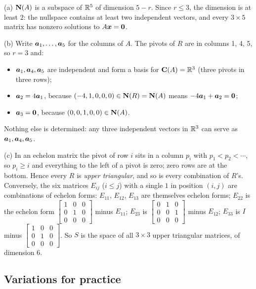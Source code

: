 \begin{solution}
(a) $\mathbf{N}(A)$ is a subspace of $\mathbb{R}^5$ of dimension $5-r$. Since $r\le 3$, the dimension is
at least $2$: the nullspace contains at least two independent vectors, and every
$3\times 5$ matrix has nonzero solutions to $A\boldsymbol{x}=\boldsymbol{0}$.

(b) Write $\boldsymbol{a}_1,\dots,\boldsymbol{a}_5$ for the columns of $A$. The pivots of $R$ are in columns
1, 4, 5, so $r=3$ and:
\begin{itemize}
  \item $\boldsymbol{a}_1,\boldsymbol{a}_4,\boldsymbol{a}_5$ are independent and form a basis for
    $\mathbf{C}(A)=\mathbb{R}^3$ (three pivots in three rows);
  \item $\boldsymbol{a}_2=4\boldsymbol{a}_1$, because $(-4,1,0,0,0)\in\mathbf{N}(R)=\mathbf{N}(A)$ means
    $-4\boldsymbol{a}_1+\boldsymbol{a}_2=\boldsymbol{0}$;
  \item $\boldsymbol{a}_3=\boldsymbol{0}$, because $(0,0,1,0,0)\in\mathbf{N}(A)$.
\end{itemize}
Nothing else is determined: any three independent vectors in $\mathbb{R}^3$ can serve as
$\boldsymbol{a}_1,\boldsymbol{a}_4,\boldsymbol{a}_5$.

(c) In an echelon matrix the pivot of row $i$ sits in a column $p_i$ with
$p_1<p_2<\cdots$, so $p_i\ge i$ and everything to the left of a pivot is zero; zero rows are
at the bottom. Hence every $R$ is \emph{upper triangular}, and so is every combination of
$R$'s. Conversely, the six matrices $E_{ij}$ ($i\le j$) with a single $1$ in position
$(i,j)$ are combinations of echelon forms:
$E_{11}$, $E_{12}$, $E_{13}$ are themselves echelon forms; $E_{22}$ is the echelon form
$\left[\begin{smallmatrix}1&0&0\\0&1&0\\0&0&0\end{smallmatrix}\right]$ minus $E_{11}$;
$E_{23}$ is $\left[\begin{smallmatrix}0&1&0\\0&0&1\\0&0&0\end{smallmatrix}\right]$ minus
$E_{12}$; $E_{33}$ is $I$ minus
$\left[\begin{smallmatrix}1&0&0\\0&1&0\\0&0&0\end{smallmatrix}\right]$.
So $S$ is the space of all $3\times 3$ upper triangular matrices, of dimension $6$.
\end{solution}

\subsection{Variations for practice}

